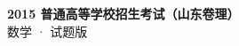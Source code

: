 \documentclass[zihao=-4, a4paper]{ctexart}
\begin{document}
\begin{center}
  {\Large\bfseries 2015 普通高等学校招生考试（山东卷理）}\\[4pt]
  {\large 数学 · 试题版}
\end{center}
\medskip
{}

\end{document}
